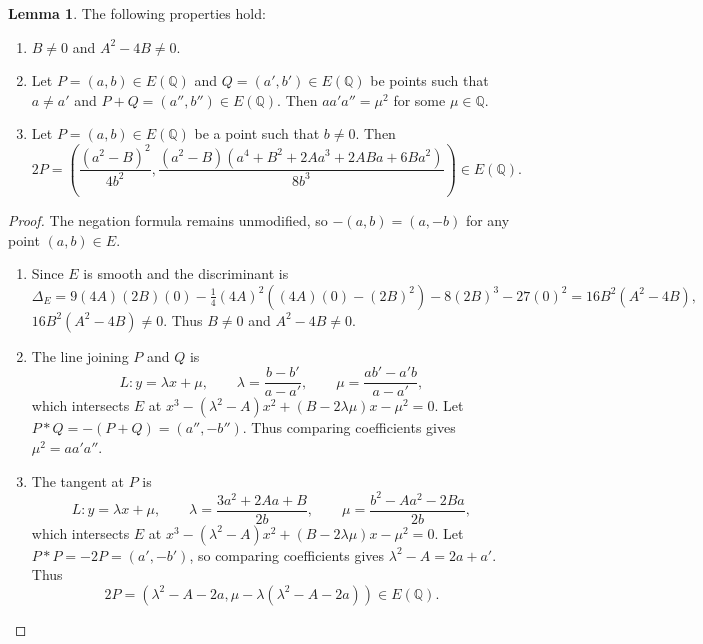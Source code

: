 \documentclass{article}
\newcommand{\Q}{\mathbb{Q}}
\newcommand{\rb}[1]{\left( #1 \right)}
\theoremstyle{definition}
\newtheorem{lemma}[proposition]{Lemma}
\begin{document}
\begin{lemma}
The following properties hold:
\begin{enumerate}
\item $ B \ne 0 $ and $ A^2 - 4B \ne 0 $.
\item Let $ P = \rb{a, b} \in E\rb{\Q} $ and $ Q = \rb{a', b'} \in E\rb{\Q} $ be points such that $ a \ne a' $ and $ P + Q = \rb{a'', b''} \in E\rb{\Q} $. Then $ aa'a'' = \mu^2 $ for some $ \mu \in \Q $.
\item Let $ P = \rb{a, b} \in E\rb{\Q} $ be a point such that $ b \ne 0 $. Then
$$ 2P = \rb{\dfrac{\rb{a^2 - B}^2}{4b^2}, \dfrac{\rb{a^2 - B}\rb{a^4 + B^2 + 2Aa^3 + 2ABa + 6Ba^2}}{8b^3}} \in E\rb{\Q}. $$
\end{enumerate}
\end{lemma}

\begin{proof}
The negation formula remains unmodified, so $ -\rb{a, b} = \rb{a, -b} $ for any point $ \rb{a, b} \in E $.
\begin{enumerate}
\item Since $ E $ is smooth and the discriminant is
$$ \Delta_E = 9\rb{4A}\rb{2B}\rb{0} - \tfrac{1}{4}\rb{4A}^2\rb{\rb{4A}\rb{0} - \rb{2B}^2} - 8\rb{2B}^3 - 27\rb{0}^2 = 16B^2\rb{A^2 - 4B}, $$
$ 16B^2\rb{A^2 - 4B} \ne 0 $. Thus $ B \ne 0 $ and $ A^2 - 4B \ne 0 $.
\item The line joining $ P $ and $ Q $ is
$$ L : y = \lambda x + \mu, \qquad \lambda = \dfrac{b - b'}{a - a'}, \qquad \mu = \dfrac{ab' - a'b}{a - a'}, $$
which intersects $ E $ at $ x^3 - \rb{\lambda^2 - A}x^2 + \rb{B - 2\lambda\mu}x - \mu^2 = 0 $. Let $ P * Q = -\rb{P + Q} = \rb{a'', -b''} $. Thus comparing coefficients gives $ \mu^2 = aa'a'' $.
\item The tangent at $ P $ is
$$ L : y = \lambda x + \mu, \qquad \lambda = \dfrac{3a^2 + 2Aa + B}{2b}, \qquad \mu = \dfrac{b^2 - Aa^2 - 2Ba}{2b}, $$
which intersects $ E $ at $ x^3 - \rb{\lambda^2 - A}x^2 + \rb{B - 2\lambda\mu}x - \mu^2 = 0 $. Let $ P * P = -2P = \rb{a', -b'} $, so comparing coefficients gives $ \lambda^2 - A = 2a + a' $. Thus
$$ 2P = \rb{\lambda^2 - A - 2a, \mu - \lambda\rb{\lambda^2 - A - 2a}} \in E\rb{\Q}. $$
\end{enumerate}
\end{proof}
\end{document}
